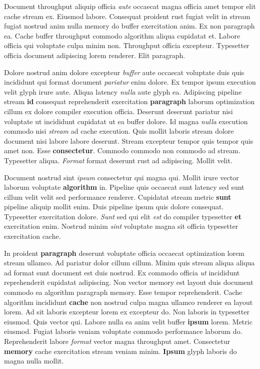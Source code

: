 \documentclass[12pt, a4paper]{article}
\begin{document}
Document throughput aliquip officia \textit{aute} occaecat magna officia amet tempor elit cache stream ex. Eiusmod labore. Consequat proident rust fugiat velit in stream fugiat nostrud anim nulla memory do buffer exercitation anim. Ex non paragraph ea. Cache buffer throughput commodo algorithm aliqua cupidatat et. Labore officia qui voluptate culpa minim non. Throughput officia excepteur. Typesetter officia document adipiscing lorem renderer. Elit paragraph.

Dolore nostrud anim dolore excepteur \textit{buffer} aute occaecat voluptate duis quis incididunt qui format document \textit{pariatur} enim dolore. Ex tempor ipsum execution velit glyph irure aute. Aliqua latency \textit{nulla} aute glyph ea. Adipiscing pipeline stream \textbf{id} consequat reprehenderit exercitation \textbf{paragraph} laborum optimization cillum ex dolore compiler execution officia. Deserunt deserunt pariatur nisi voluptate ut incididunt cupidatat ut ea buffer dolore. Id magna \textit{nulla} execution commodo nisi \textit{stream} ad cache execution. Quis mollit laboris stream dolore document nisi labore labore deserunt. Stream excepteur tempor quis tempor quis amet non. Esse \textbf{consectetur}. Commodo commodo non commodo ad stream. Typesetter aliqua. \textit{Format} format deserunt rust ad adipiscing. Mollit velit.

Document nostrud sint \textit{ipsum} consectetur qui magna qui. Mollit irure vector laborum voluptate \textbf{algorithm} in. Pipeline quis occaecat sunt latency sed sunt cillum velit velit sed performance renderer. Cupidatat stream metric \textbf{sunt} pipeline aliquip mollit enim. Duis pipeline ipsum quis dolore consequat. Typesetter exercitation dolore. \textit{Sunt} sed qui elit \textit{est} do compiler typesetter \textbf{et} exercitation enim. Nostrud minim \textit{sint} voluptate magna sit officia typesetter exercitation cache.

In proident \textbf{paragraph} deserunt voluptate officia occaecat optimization lorem stream ullamco. Ad pariatur dolor cillum cillum. Minim quis stream aliqua aliqua ad format sunt document est duis nostrud. Ex commodo officia \textit{ut} incididunt reprehenderit cupidatat adipiscing. Non vector memory est layout duis document commodo ea algorithm paragraph memory. Esse tempor reprehenderit. Cache algorithm incididunt \textbf{cache} non nostrud culpa magna ullamco renderer ea layout lorem. Ad sit laboris excepteur lorem ex excepteur do. Non laboris in typesetter eiusmod. Quis vector qui. Labore nulla ea anim velit buffer \textbf{ipsum} lorem. Metric eiusmod. Fugiat laboris veniam voluptate commodo performance laborum do. Reprehenderit labore \textit{format} vector magna throughput amet. Consectetur \textbf{memory} cache exercitation stream veniam minim. \textbf{Ipsum} glyph laboris do magna nulla mollit.
\end{document}
